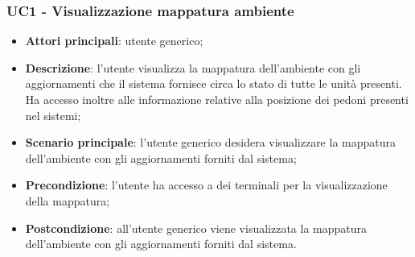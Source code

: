 \subsubsection{UC1 - Visualizzazione mappatura ambiente}
\begin{itemize}
		\item \textbf{Attori principali}: utente generico;
		\item \textbf{Descrizione}: l'utente visualizza la mappatura dell'ambiente con gli aggiornamenti  che il sistema fornisce circa lo stato di tutte le unità presenti. Ha accesso inoltre alle informazione relative alla posizione dei pedoni presenti nel sistemi;
		\item \textbf{Scenario principale}: l'utente generico desidera visualizzare la mappatura dell'ambiente con gli aggiornamenti  forniti dal sistema; 
		\item \textbf{Precondizione}: l'utente ha accesso a dei terminali per la visualizzazione della mappatura;
		\item \textbf{Postcondizione}: all'utente generico viene visualizzata la mappatura dell'ambiente con gli aggiornamenti  forniti dal sistema. 
\end{itemize}